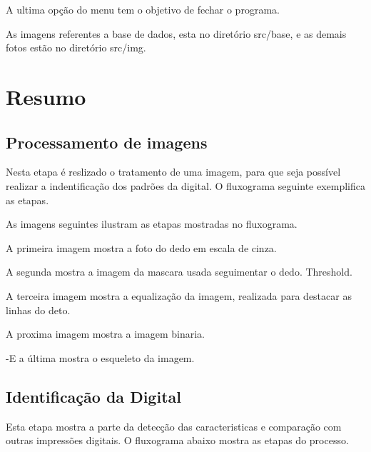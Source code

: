 A ultima opção do menu tem o objetivo de fechar o programa.

As imagens referentes a base de dados, esta no diretório src/base, e as demais fotos estão no diretório src/img.\hypertarget{index_sec_summary}{}\section{Resumo}\label{index_sec_summary}
\hypertarget{index_ssec3}{}\subsection{Processamento de imagens}\label{index_ssec3}
Nesta etapa é reslizado o tratamento de uma imagem, para que seja possível realizar a indentificação dos padrões da digital. O fluxograma seguinte exemplifica as etapas.



As imagens seguintes ilustram as etapas mostradas no fluxograma.


\begin{DoxyItemize}
\item A primeira imagem mostra a foto do dedo em escala de cinza.
\end{DoxyItemize}




\begin{DoxyItemize}
\item A segunda mostra a imagem da mascara usada seguimentar o dedo. Threshold. ~\newline
 
\item A terceira imagem mostra a equalização da imagem, realizada para destacar as linhas do deto.
\end{DoxyItemize}




\begin{DoxyItemize}
\item A proxima imagem mostra a imagem binaria.
\end{DoxyItemize}



-\/E a última mostra o esqueleto da imagem.

\hypertarget{index_ssec4}{}\subsection{Identificação da Digital}\label{index_ssec4}
Esta etapa mostra a parte da detecção das caracteristicas e comparação com outras impressões digitais. O fluxograma abaixo mostra as etapas do processo.




